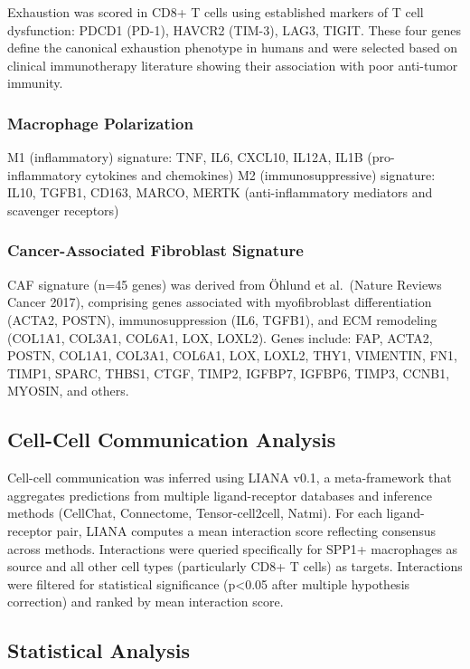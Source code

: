 \documentclass[12pt,twoside]{article}
\begin{document}
Exhaustion was scored in CD8+ T cells using established markers of T cell dysfunction: PDCD1 (PD-1), HAVCR2 (TIM-3), LAG3, TIGIT. These four genes define the canonical exhaustion phenotype in humans and were selected based on clinical immunotherapy literature showing their association with poor anti-tumor immunity.

\subsubsection{Macrophage Polarization}

M1 (inflammatory) signature: TNF, IL6, CXCL10, IL12A, IL1B (pro-inflammatory cytokines and chemokines)
M2 (immunosuppressive) signature: IL10, TGFB1, CD163, MARCO, MERTK (anti-inflammatory mediators and scavenger receptors)

\subsubsection{Cancer-Associated Fibroblast Signature}

CAF signature (n=45 genes) was derived from Öhlund et al.\ (Nature Reviews Cancer 2017), comprising genes associated with myofibroblast differentiation (ACTA2, POSTN), immunosuppression (IL6, TGFB1), and ECM remodeling (COL1A1, COL3A1, COL6A1, LOX, LOXL2). Genes include: FAP, ACTA2, POSTN, COL1A1, COL3A1, COL6A1, LOX, LOXL2, THY1, VIMENTIN, FN1, TIMP1, SPARC, THBS1, CTGF, TIMP2, IGFBP7, IGFBP6, TIMP3, CCNB1, MYOSIN, and others.

\subsection{Cell-Cell Communication Analysis}

Cell-cell communication was inferred using LIANA v0.1, a meta-framework that aggregates predictions from multiple ligand-receptor databases and inference methods (CellChat, Connectome, Tensor-cell2cell, Natmi). For each ligand-receptor pair, LIANA computes a mean interaction score reflecting consensus across methods. Interactions were queried specifically for SPP1+ macrophages as source and all other cell types (particularly CD8+ T cells) as targets. Interactions were filtered for statistical significance (p<0.05 after multiple hypothesis correction) and ranked by mean interaction score.

\subsection{Statistical Analysis}
\end{document}
